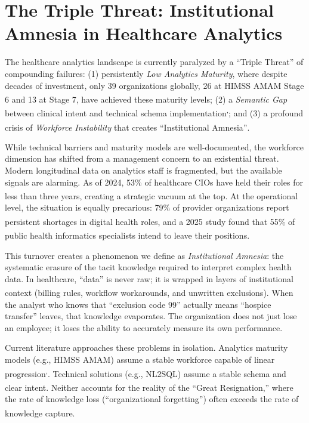 \documentclass[
  american,
  11pt,
  letterpaper,
  oneside  ,captions=tableheading
]{scrartcl}
\begin{document}
{
\setcounter{tocdepth}{3}
\tableofcontents
}
\section{The Triple Threat: Institutional Amnesia in Healthcare
Analytics}\label{the-triple-threat-institutional-amnesia-in-healthcare-analytics}

The healthcare analytics landscape is currently paralyzed by a ``Triple
Threat'' of compounding failures: (1) persistently \emph{Low Analytics
Maturity}, where despite decades of investment, only 39 organizations
globally, 26 at HIMSS AMAM Stage 6 and 13 at Stage 7, have achieved
these maturity levels\textsuperscript{}; (2)
a \emph{Semantic Gap} between clinical intent and technical schema
implementation\textsuperscript{,};
and (3) a profound crisis of \emph{Workforce Instability} that creates
``Institutional Amnesia''\textsuperscript{}.

While technical barriers and maturity models are well-documented, the
workforce dimension has shifted from a management concern to an
existential threat. Modern longitudinal data on analytics staff is
fragmented, but the available signals are alarming. As of 2024, 53\% of
healthcare CIOs have held their roles for less than three
years\textsuperscript{}, creating a
strategic vacuum at the top. At the operational level, the situation is
equally precarious: 79\% of provider organizations report persistent
shortages in digital health
roles\textsuperscript{}, and a 2025
study found that 55\% of public health informatics specialists intend to
leave their positions\textsuperscript{}.

This turnover creates a phenomenon we define as \emph{Institutional
Amnesia}: the systematic erasure of the tacit knowledge required to
interpret complex health data. In healthcare, ``data'' is never raw; it
is wrapped in layers of institutional context (billing rules, workflow
workarounds, and unwritten
exclusions)\textsuperscript{}. When the
analyst who knows that ``exclusion code 99'' actually means ``hospice
transfer'' leaves, that knowledge evaporates. The organization does not
just lose an employee; it loses the ability to accurately measure its
own performance.

Current literature approaches these problems in isolation. Analytics
maturity models (e.g., HIMSS AMAM) assume a stable workforce capable of
linear
progression\textsuperscript{,}.
Technical solutions (e.g., NL2SQL) assume a stable schema and clear
intent\textsuperscript{}. Neither accounts
for the reality of the ``Great Resignation,'' where the rate of
knowledge loss (``organizational forgetting'') often exceeds the rate of
knowledge capture\textsuperscript{}.
\end{document}
